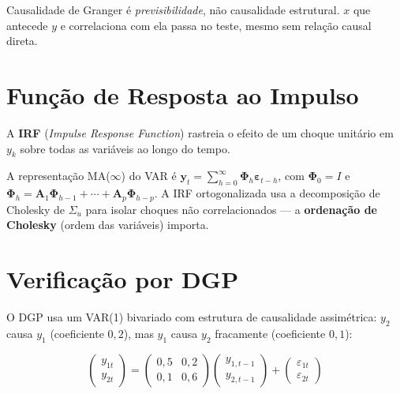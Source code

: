 \begin{nota}
  Causalidade de Granger é \emph{previsibilidade}, não causalidade
  estrutural. $x$ que antecede $y$ e correlaciona com ela passa no teste,
  mesmo sem relação causal direta.
\end{nota}

\section{Função de Resposta ao Impulso}

A \textbf{IRF} (\emph{Impulse Response Function}) rastreia o efeito de um
choque unitário em $y_k$ sobre todas as variáveis ao longo do tempo.

A representação MA($\infty$) do VAR é $\mathbf{y}_t = \sum_{h=0}^\infty
\mathbf{\Phi}_h \boldsymbol{\varepsilon}_{t-h}$, com $\mathbf{\Phi}_0 = I$
e $\mathbf{\Phi}_h = \mathbf{A}_1 \mathbf{\Phi}_{h-1} + \cdots +
\mathbf{A}_p \mathbf{\Phi}_{h-p}$. A IRF ortogonalizada usa a decomposição
de Cholesky de $\Sigma_u$ para isolar choques não correlacionados — a
\textbf{ordenação de Cholesky} (ordem das variáveis) importa.

\section{Verificação por DGP}

O DGP usa um VAR(1) bivariado com estrutura de causalidade assimétrica:
$y_2$ causa $y_1$ (coeficiente $0{,}2$), mas $y_1$ causa $y_2$
fracamente (coeficiente $0{,}1$):

\[
  \begin{pmatrix} y_{1t} \\ y_{2t} \end{pmatrix}
  = \begin{pmatrix} 0{,}5 & 0{,}2 \\ 0{,}1 & 0{,}6 \end{pmatrix}
    \begin{pmatrix} y_{1,t-1} \\ y_{2,t-1} \end{pmatrix}
  + \begin{pmatrix} \varepsilon_{1t} \\ \varepsilon_{2t} \end{pmatrix}
\]

